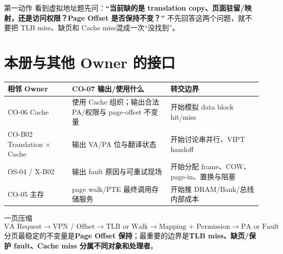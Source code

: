 \documentclass[UTF8,fontset=fandol,11pt,a4paper]{ctexart}
\newcommand{\kw}[1]{\textbf{\color{deep}#1}}\newcommand{\code}[1]{\texttt{#1}}
\begin{document}
\begin{methodbox}{第一动作}
看到虚拟地址题先问：\kw{“当前缺的是 translation copy、页面驻留/映射，还是访问权限？Page Offset 是否保持不变？”} 不先回答这两个问题，就不要把 TLB miss、缺页和 Cache miss混成一次“没找到”。
\end{methodbox}

\section{本册与其他 Owner 的接口}
\begin{center}\small
\begin{tabularx}{\linewidth}{L{3cm}YY}
\toprule
相邻 Owner & CO-07 输出/使用什么 & 转交边界\\\midrule
CO-06 Cache & 使用 Cache 组织；输出合法 PA/权限与 page-offset 不变量 & 开始模拟 data block hit/miss\\
CO-B02 Translation × Cache & 输出 VA/PA 位与翻译状态 & 开始讨论串并行、VIPT handoff\\
OS-04 / X-B02 & 输出 fault 原因与可重试现场 & 开始分配 frame、COW、page-in、置换与阻塞\\
CO-05 主存 & page walk/PTE 最终调用存储服务 & 开始推 DRAM/Bank/总线内部成本\\
\bottomrule
\end{tabularx}
\end{center}

\begin{corebox}{一页压缩}
\[
\boxed{
\text{VA Request}
\to\text{VPN / Offset}
\to\text{TLB or Walk}
\to\text{Mapping + Permission}
\to\text{PA or Fault}}
\]
分页最稳定的不变量是\textbf{Page Offset 保持}；最重要的边界是\textbf{TLB miss、缺页/保护 fault、Cache miss 分属不同对象和处理者}。
\end{corebox}
\end{document}
